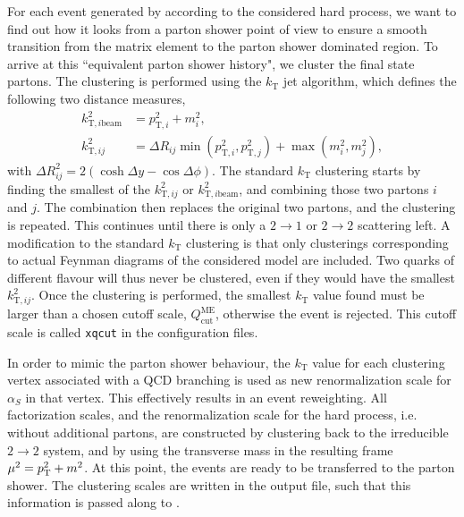For each event generated by \MADGRAPH according to the considered hard process, we want to
find out how it looks from a parton shower point of view to ensure a smooth transition from the
matrix element to the parton shower dominated region.
To arrive at this ``equivalent parton shower history", we cluster the final state partons. 
The clustering is performed using the $k_\text{T}$ jet algorithm, which defines the following two
distance measures,
\begin{align}
  k^2_{\mathrm{T},i\text{beam}} &= p_{\mathrm{T},i}^2 + m_i^2, \\ 
  k^2_{\mathrm{T},ij} &= \Delta R_{ij} \min (p_{\mathrm{T},i}^2 , p_{\mathrm{T},j}^2) + \max (m_i^2,
m_j^2),
\end{align}
with $\Delta R^2_{ij} = 2 (\cosh \Delta y - \cos \Delta\phi)$. The standard $k_\text{T}$ clustering
starts by finding the smallest of the $k^2_{\mathrm{T},ij}$ or $k^2_{\mathrm{T},i\text{beam}}$, and
combining those two partons $i$ and $j$. The combination then replaces the original two partons, and
the clustering is repeated. This continues until there is only a $2 \rightarrow 1$ or $2 \rightarrow
2$ scattering left.
A modification to the standard $k_\text{T}$ clustering is that only clusterings corresponding to
actual Feynman diagrams of the considered model are included. Two quarks of different flavour will
thus never be clustered, even if they would have the smallest $k^2_{\mathrm{T},ij}$. 
Once the clustering is performed, the smallest $k_\mathrm{T}$ value found must be larger than a
chosen cutoff scale, $Q_{\mathrm{cut}}^{\mathrm{ME}}$, otherwise the event is rejected. This cutoff
scale is called \texttt{xqcut} in the \MADGRAPH configuration files. 

In order to mimic the parton shower behaviour, the $k_\mathrm{T}$ value for each clustering vertex
associated with a QCD branching is used as new renormalization scale for $\alpha_S$ in that
vertex. This effectively results in an event reweighting. 
All factorization scales, and the renormalization scale for the hard process, i.e. without
additional partons, are constructed by clustering back to the irreducible $2 \rightarrow 2$ system,
and by using the transverse mass in the resulting frame $\mu^2 = p_{\mathrm{T}}^2 + m^2$. 
At this point, the events are ready to be transferred to the parton shower. 
The clustering scales are written in the output file, such that this information is passed along to
\PYTHIA. 



